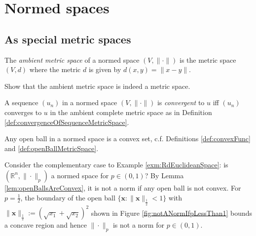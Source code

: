 \section{Normed spaces}
\label{sec:normed-banach-spaces}

\subsection{As special metric spaces}

\begin{defn}
  \label{def:ambientMetricSpace}
  The \emph{ambient metric space} of a normed space $(V, \|\cdot\|)$
  is the metric space $(V, d)$
  where the metric $d$ is given by
  $d(x,y) = \|x-y\|$.
\end{defn}

\begin{exc}
  Show that the ambient metric space is indeed a metric space.
\end{exc}

\begin{defn}%
  \label{def:convergenceNormedSpace}
  A sequence $(u_n)$ in a normed space $(V, \|\cdot\|)$
  is \emph{convergent} to $u$
  iff $(u_n)$ converges to $u$
  in the ambient complete metric space
  as in Definition \ref{def:convergenceOfSequenceMetricSpace}.
\end{defn}

\begin{lem}
  \label{lem:openBallsAreConvex}
  Any open ball in a normed space is a convex set,
  c.f. Definitions \ref{def:convexFunc} and \ref{def:openBallMetricSpace}.
\end{lem}

\begin{exm}
  \label{exm:notEuclidNormIfLess1}
  Consider the complementary case to Example \ref{exm:RdEuclideanSpace}:
  is $\left(\mathbb{R}^n, \|\cdot\|_p\right)$
  a normed space for $p\in(0,1)$?
  By Lemma \ref{lem:openBallsAreConvex},
  it is not a norm if any open ball is not convex.
  For $p=\frac{1}{2}$,
  the boundary of the open ball
  $\{\mathbf{x}: \|\mathbf{x}\|_{\frac{1}{2}}<1\}$ with
  $\|\mathbf{x}\|_{\frac{1}{2}}:=\left(\sqrt{x_1}+\sqrt{x_2}\right)^2$
  shown in Figure \ref{fig:notANormIfpLessThan1} bounds a concave region 
  and hence $\|\cdot\|_p$ is not a norm for $p\in(0,1)$.
\end{exm}


